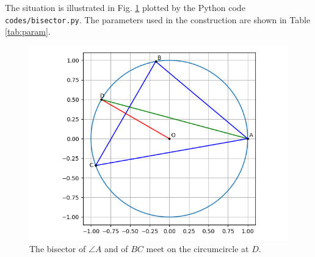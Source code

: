 \documentclass[journal,12pt,twocolumn]{IEEEtran}
\begin{document}
\begin{enumerate}
    The situation is illustrated in Fig. \ref{fig:bisector} plotted 
    by the Python code \texttt{codes/bisector.py}. The parameters
    used in the construction are shown in Table \ref{tab:param}.
    \begin{table}[!ht]
        \centering
        
        \caption{Parameters used in the construction of Fig. \ref{fig:bisector}.}
        \label{tab:param}
    \end{table}
    \begin{figure}[!ht]
        \centering
        \includegraphics[width=\columnwidth]{figs/bisector.png}
        \caption{The bisector of $\angle A$ and of $BC$ meet on the circumcircle at $D$.}
        \label{fig:bisector}
    \end{figure}
\end{enumerate}
\end{document}
